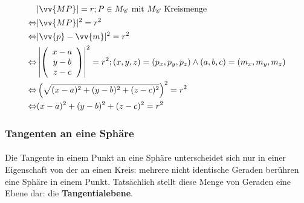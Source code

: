 \documentclass[main.tex]{subfiles}
\begin{document}
        \begin{Beweis}
            \begin{align*}
                                &|\vv{MP}| = r ; P \in M_\mathscr{C} \text{ mit $M_\mathscr{C}$ Kreismenge} \\
                \Leftrightarrow &|\vv{MP}|^2 = r^2 \\
                \Leftrightarrow &|\vv{p} - \vv{m}|^2 = r^2 \\
                \Leftrightarrow &\left|\left(\begin{array}{c} x - a \\ y - b \\ z - c \end{array}\right)\right|^2 = r^2 ; (x,y,z) = (p_x,p_y,p_z) \land (a,b,c) = (m_x,m_y,m_z) \\
                \Leftrightarrow &\left(\sqrt{(x - a)^2 + (y - b)^2 + (z - c)^2}\right)^2 = r^2 \\
                \Leftrightarrow &(x - a)^2 + (y - b)^2 + (z - c)^2 = r^2 \\
            \end{align*}
        \end{Beweis}


        \subsubsection{Tangenten an eine Sphäre}

            \begin{Definition}
                \paragraph{} Die Tangente in einem Punkt an eine Sphäre unterscheidet sich nur in einer Eigenschaft von der an einen Kreis: mehrere nicht identische Geraden berühren eine Sphäre in einem Punkt. Tatsächlich stellt diese Menge von Geraden eine Ebene dar: die \textbf{Tangentialebene}.
            \end{Definition}
\end{document}
